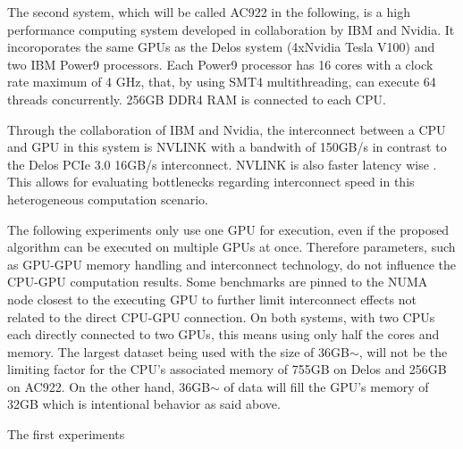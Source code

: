 The second system, which will be called AC922 in the following, is a high performance computing system developed in collaboration by IBM and Nvidia. It incoroporates the same GPUs as the Delos system (4xNvidia Tesla V100) and two IBM Power9 processors. Each Power9 processor has 16 cores with a clock rate maximum of 4 GHz, that, by using SMT4 multithreading, can execute 64 threads concurrently. 256GB DDR4 RAM is connected to each CPU.

Through the collaboration of IBM and Nvidia, the interconnect between a CPU and GPU in this system is NVLINK with a bandwith of 150GB/s in contrast to the Delos PCIe 3.0 16GB/s interconnect. NVLINK is also faster latency wise \cite{liEvaluatingModernGPU2020}. This allows for evaluating bottlenecks regarding interconnect speed in this heterogeneous computation scenario.

The following experiments only use one GPU for execution, even if the proposed algorithm can be executed on multiple GPUs at once. Therefore parameters, such as GPU-GPU memory handling and interconnect technology, do not influence the CPU-GPU computation results. Some benchmarks are pinned to the NUMA node closest to the executing GPU to further limit interconnect effects not related to the direct CPU-GPU connection. On both systems, with two CPUs each directly connected to two GPUs, this means using only half the cores and memory. The largest dataset being used with the size of 36GB$\sim$, will not be the limiting factor for the CPU's associated memory of 755GB on Delos and 256GB on AC922. On the other hand, 36GB$\sim$ of data will fill the GPU's memory of 32GB which is intentional behavior as said above.


The first experiments




